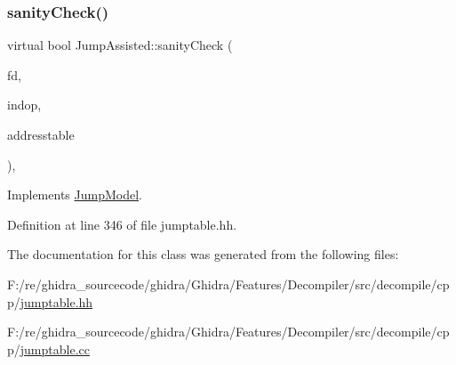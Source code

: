\subsubsection{\texorpdfstring{sanityCheck()}{sanityCheck()}}
{\footnotesize\ttfamily virtual bool Jump\+Assisted\+::sanity\+Check (\begin{DoxyParamCaption}\item[{\mbox{\hyperlink{class_funcdata}{Funcdata}} $\ast$}]{fd,  }\item[{\mbox{\hyperlink{class_pcode_op}{Pcode\+Op}} $\ast$}]{indop,  }\item[{vector$<$ \mbox{\hyperlink{class_address}{Address}} $>$ \&}]{addresstable }\end{DoxyParamCaption})\hspace{0.3cm}{\ttfamily [inline]}, {\ttfamily [virtual]}}



Implements \mbox{\hyperlink{class_jump_model_a76a52bf3311e9d97a61d1117f6de1b0a}{Jump\+Model}}.



Definition at line 346 of file jumptable.\+hh.



The documentation for this class was generated from the following files\+:\begin{DoxyCompactItemize}
\item 
F\+:/re/ghidra\+\_\+sourcecode/ghidra/\+Ghidra/\+Features/\+Decompiler/src/decompile/cpp/\mbox{\hyperlink{jumptable_8hh}{jumptable.\+hh}}\item 
F\+:/re/ghidra\+\_\+sourcecode/ghidra/\+Ghidra/\+Features/\+Decompiler/src/decompile/cpp/\mbox{\hyperlink{jumptable_8cc}{jumptable.\+cc}}\end{DoxyCompactItemize}
